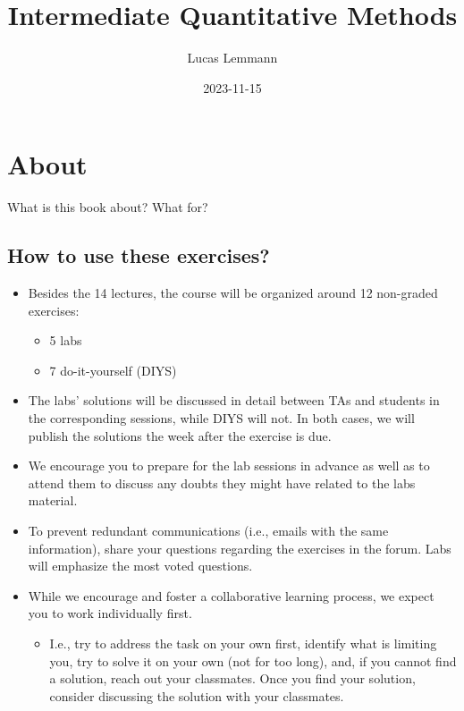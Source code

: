 \documentclass[
]{book}
\title{Intermediate Quantitative Methods}
\author{Lucas Lemmann}
\date{2023-11-15}
\providecommand{\tightlist}{%
  \setlength{\itemsep}{0pt}\setlength{\parskip}{0pt}}
\begin{document}
\maketitle

{
\setcounter{tocdepth}{1}
\tableofcontents
}
\hypertarget{about}{%
\chapter*{About}\label{about}}

What is this book about? What for?

\hypertarget{how-to-use-these-exercises}{%
\section{How to use these exercises?}\label{how-to-use-these-exercises}}

\begin{itemize}
\tightlist
\item
  Besides the 14 lectures, the course will be organized around 12 non-graded exercises:

  \begin{itemize}
  \tightlist
  \item
    5 labs
  \item
    7 do-it-yourself (DIYS)
  \end{itemize}
\item
  The labs' solutions will be discussed in detail between TAs and students in the corresponding sessions, while DIYS will not. In both cases, we will publish the solutions the week after the exercise is due.
\item
  We encourage you to prepare for the lab sessions in advance as well as to attend them to discuss any doubts they might have related to the labs material.
\item
  To prevent redundant communications (i.e., emails with the same information), share your questions regarding the exercises in the forum. Labs will emphasize the most voted questions.
\item
  While we encourage and foster a collaborative learning process, we expect you to work individually first.

  \begin{itemize}
  \tightlist
  \item
    I.e., try to address the task on your own first, identify what is limiting you, try to solve it on your own (not for too long), and, if you cannot find a solution, reach out your classmates. Once you find your solution, consider discussing the solution with your classmates.
  \end{itemize}
\end{itemize}
\end{document}

